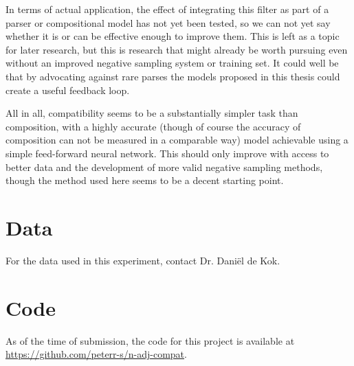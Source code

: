 \documentclass[a4paper, 12pt]{article}
\begin{document}
In terms of actual application, the effect of integrating this filter as part of a parser or compositional model has not yet been tested, so we can not yet say whether it is or can be effective enough to improve them. This is left as a topic for later research, but this is research that might already be worth pursuing even without an improved negative sampling system or training set. It could well be that by advocating against rare parses the models proposed in this thesis could create a useful feedback loop.

All in all, compatibility seems to be a substantially simpler task than composition, with a highly accurate (though of course the accuracy of composition can not be measured in a comparable way) model achievable using a simple feed-forward neural network. This should only improve with access to better data and the development of more valid negative sampling methods, though the method used here seems to be a decent starting point.


\clearpage
\printbibliography                      %

\clearpage
\appendix
\appendixpage                           %
\addappheadtotoc                        %

\section{Data}
For the data used in this experiment, contact Dr. Dani\"el de Kok.

\section{Code}
As of the time of submission, the code for this project is available at \url{https://github.com/peterr-s/n-adj-compat}.
\end{document}
